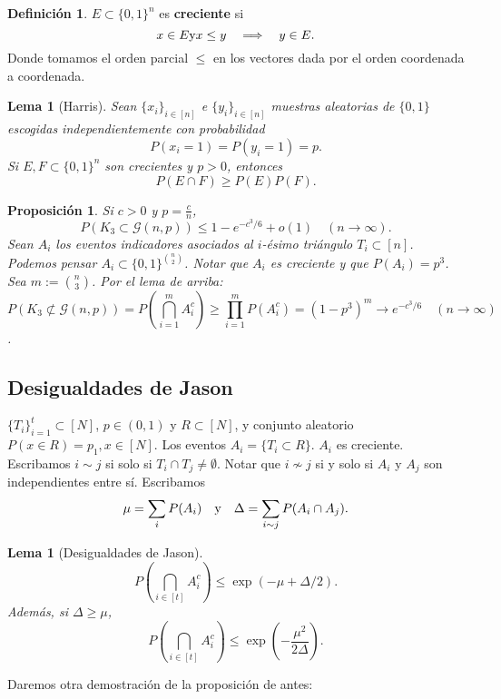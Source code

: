 \documentclass[12pt]{report}
\theoremstyle{plain}
\newtheorem{lemma}[theorem]{Lema}
\newtheorem{proposition}[theorem]{Proposición}
\theoremstyle{definition}
\newtheorem{definition}[theorem]{Definición}
\begin{document}
\begin{definition}
    $E \subset \{0,1\}^n$ es \textbf{creciente} si
    \[
    x \in E \text y x \leq y \quad \Longrightarrow \quad y \in E.
    \]
    Donde tomamos el orden parcial $\leq$ en los vectores dada por el orden coordenada a coordenada.

\end{definition}

\begin{lemma}[Harris]
Sean $\{x_i\}_{i \in [n]}$ e $\{y_i\}_{i \in [n]}$ \textit{muestras aleatorias} de $\{0,1\}$ escogidas independientemente con probabilidad
\[
P (x_i = 1) = P (y_i = 1) = p.
\]
Si $E, F \subset \{0,1\}^n$ son crecientes y $p > 0$, entonces
\[
P(E \cap F) \geq P(E) P(F).
\]
\end{lemma}

\begin{proposition}
Si $c > 0$ y $p = \frac c n$,
\[
P (K_3 \subset \mathcal G (n, p)) \leq 1 - e^{- c^3/6} + o(1) \quad (n \to \infty).
\]
Sean $A_i$ los eventos indicadores asociados al $i$-ésimo triángulo $T_i \subset [n]$. Podemos pensar $A_i \subset \{0,1\}^{\binom n 2}$. Notar que $A_i$ es creciente y que $P (A_i) = p^3$. Sea $m := \binom n 3$. Por el lema de arriba:
\[
P(K_3 \not \subset \mathcal G (n,p)) = P (\bigcap_{i = 1}^m A_i^c) \geq \prod_{i = 1}^m P(A_i^c) = (1- p^3)^m \longrightarrow e^{-c^3 / 6} \quad (n \to \infty)
\].
\end{proposition}

\subsection{Desigualdades de Jason}

$\{ T_i\}_{i = 1}^t \subset [N]$, $p \in (0,1)$ y $R \subset [N]$, y conjunto aleatorio $P( x \in R) = p_1 , x \in [N]$. Los eventos $A_i = \{T_i \subset R\}$. $A_i$ es creciente. Escribamos $i \sim j$ si solo si $T_i \cap T_j \neq \emptyset$. Notar que $i \not \sim j$ si y solo si $A_i$ y $A_j$ son independientes entre sí. Escribamos
\[
\mu = \sum_i P(A_i) \quad \text y \quad \Delta = \sum_{i \sim j} P (A_i \cap A_j).
\]

\begin{lemma}[Desigualdades de Jason]
\[
    P (\bigcap_{i \in [t]} A_i^c) \leq \exp (- \mu + \Delta / 2).
\]
Además, si $\Delta \geq \mu$,
\[
P (\bigcap_{ i \in [t]} A_i^c) \leq \exp ( - \frac{\mu^2}{2 \Delta}).
\]
\end{lemma}

Daremos otra demostración de la proposición de antes:
\end{document}
